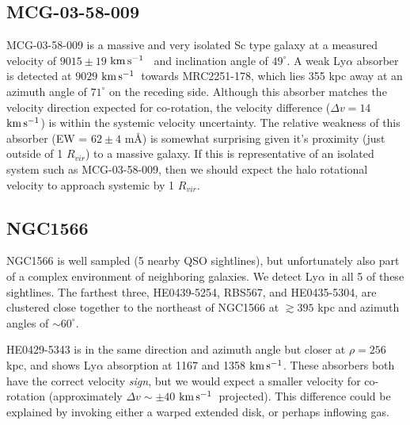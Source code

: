 \documentclass[iop]{emulateapj-rtx4}
\newcommand{\kms}{$\rm km\, s^{-1}$}
\begin{document}
\subsection{MCG-03-58-009}
MCG-03-58-009 is a massive and very isolated Sc type galaxy at a measured velocity of $9015 \pm 19$ \kms~ and inclination angle of $49^{\circ}$. A weak Ly$\alpha$ absorber is detected at $9029$ \kms~towards MRC2251-178, which lies 355 kpc away at an azimuth angle of $71^{\circ}$ on the receding side. Although this absorber matches the velocity direction expected for co-rotation, the velocity difference ($\Delta v = 14$ \kms) is within the systemic velocity uncertainty. The relative weakness of this absorber (EW = $62 \pm 4$ m\AA) is somewhat surprising given it's proximity (just outside of 1 $R_{vir}$) to a massive galaxy. If this is representative of an isolated system such as MCG-03-58-009, then we should expect the halo rotational velocity to approach systemic by 1 $R_{vir}$.

%



\subsection{NGC1566}
NGC1566 is well sampled (5 nearby QSO sightlines), but unfortunately also part of a complex environment of neighboring galaxies. We detect Ly$\alpha$ in all 5 of these sightlines. The farthest three, HE0439-5254, RBS567, and HE0435-5304, are clustered close together to the northeast of NGC1566 at $\gtrsim 395$ kpc and azimuth angles of $\sim 60^{\circ}$. 

HE0429-5343 is in the same direction and azimuth angle but closer at $\rho = 256$ kpc, and shows Ly$\alpha$ absorption at 1167 and 1358 \kms. These absorbers both have the correct velocity \emph{sign}, but we would expect a smaller velocity for co-rotation (approximately $\Delta v \sim \pm40$ \kms~projected). This difference could be explained by invoking either a warped extended disk, or perhaps inflowing gas.
\end{document}
